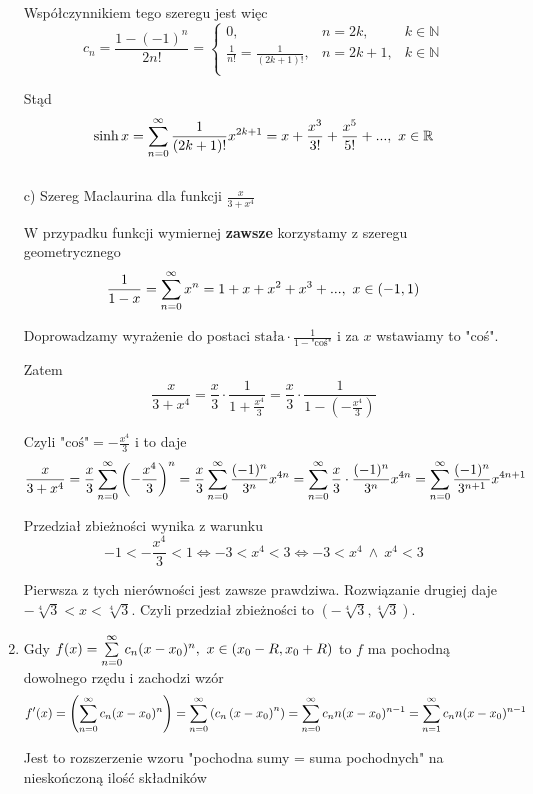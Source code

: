 \begin{enumerate}
    Współczynnikiem tego szeregu jest więc 
    $$ c_n = \frac{1-(-1)^n}{2n!} =\left\{ \begin{array}{cll}
        0, & n = 2k, & k \in \mathbb{N} \\
        \frac{1}{n!} = \frac{1}{(2k+1)!}, & n = 2k + 1, & k \in \mathbb{N} \\
    \end{array} \right. $$

    Stąd
    $$ \sinh x = \sum\limits_{n = 0}^{\infty} \frac{1}{(2k+1)!} x^{2k+1} = x + \frac{x^3}{3!} + \frac{x^5}{5!} + ..., \ x \in \mathbb{R} $$ \\

    c) Szereg Maclaurina dla funkcji $ \frac{x}{3 + x^4} $

    W przypadku funkcji wymiernej \textbf{zawsze} korzystamy z szeregu geometrycznego
    $$ \frac{1}{1-x} = \sum\limits_{n = 0}^{\infty} x^n = 1 + x + x^2 + x^3 + ..., \ x \in (-1, 1) $$

    Doprowadzamy wyrażenie do postaci \textbf{$\textrm{stała} \cdot \frac{1}{1 - \textrm{"coś"}}$}
    i za $x$ wstawiamy to "coś".

    Zatem
    $$ \frac{x}{3 + x^4} = \frac{x}{3} \cdot \frac{1}{1 + \frac{x^4}{3}} = \frac{x}{3} \cdot \frac{1}{1 - \left( - \frac{x^4}{3} \right)} $$

    Czyli $ \textrm{"coś"} = -\frac{x^4}{3} $ i to daje
    $$ \frac{x}{3+x^4} = \frac{x}{3} \sum\limits_{n = 0}^{\infty} \left(-\frac{x^4}{3} \right)^n =
    \frac{x}{3} \sum\limits_{n = 0}^{\infty} \frac{(-1)^n}{3^n} x^{4n} = \sum\limits_{n = 0}^{\infty} \frac{x}{3} \cdot \frac{(-1)^n}{3^n} x^{4n} 
    = \sum\limits_{n = 0}^{\infty} \frac{(-1)^n}{3^{n+1}} x^{4n+1} $$

    Przedział zbieżności wynika z warunku
    $$ -1 < -\frac{x^4}{3} < 1 \Leftrightarrow -3 < x^4 < 3 \Leftrightarrow -3 < x^4 \ \land \ x^4 < 3 $$

    Pierwsza z tych nierówności jest zawsze prawdziwa. Rozwiązanie drugiej daje $ -\sqrt[4]{3} < x < \sqrt[4]{3} $.
    Czyli przedział zbieżności to $ (-\sqrt[4]{3}, \sqrt[4]{3}) $. \\

    \item Gdy $ f(x) = \sum\limits_{n = 0}^{\infty} c_n(x - x_0)^n, \ x \in (x_0 - R, x_0 + R) $ to $f$ ma pochodną
    dowolnego rzędu i zachodzi wzór
    $$ f'(x) = \left( \sum\limits_{n = 0}^{\infty} c_n(x - x_0)^n \right) = \sum\limits_{n = 0}^{\infty} \left( c_n \left( x - x_0 \right)^{n} \right) 
    = \sum\limits_{n = 0}^{\infty} c_n n (x - x_0)^{n - 1} = \sum\limits_{n = 1}^{\infty} c_n n (x - x_0)^{n - 1}$$

    Jest to rozszerzenie wzoru "pochodna sumy = suma pochodnych" na nieskończoną ilość składników \\


\end{enumerate}

